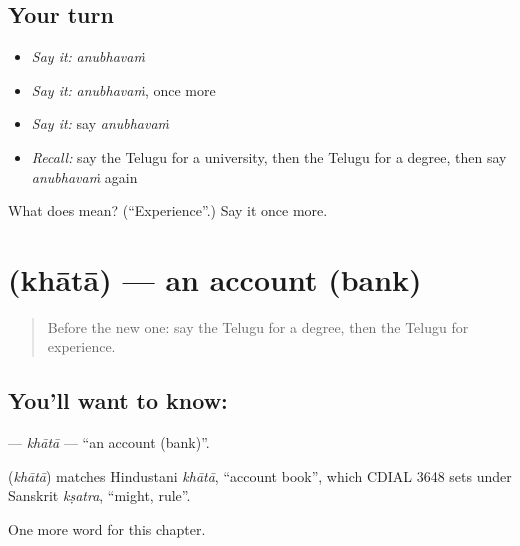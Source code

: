 \subsection*{Your turn}
\begin{itemize}
\raggedright
  \item \emph{Say it:} \emph{anubhavaṁ}
  \item \emph{Say it:} \emph{anubhavaṁ}, once more
  \item \emph{Say it:} say \emph{anubhavaṁ}
  \item \emph{Recall:} say the Telugu for a university, then the Telugu for a degree, then say \emph{anubhavaṁ} again
\end{itemize}

\begin{tcolorbox}[breakable,colback=teal!4,colframe=teal!35!black,title={Before you move on}]
What does  mean? (\textquotedblleft{}Experience\textquotedblright{}.) Say it once more.
\end{tcolorbox}
\section[\texorpdfstring{\te{ఖాతా} (khātā)}{ఖాతా (khātā)}]{ (khātā) — an account (bank)}

\label{lesson:TE-C311-khata}



\begin{quote}
Before the new one: say the Telugu for a degree, then the Telugu for experience.
\end{quote}

\subsection*{You'll want to know: }
\textbf{} — \emph{khātā} — \textquotedblleft{}an account (bank)\textquotedblright{}.

\begin{cousinweb}
\textbf{} (\emph{khātā}) matches Hindustani \emph{khātā}, \textquotedblleft{}account book\textquotedblright{}, which CDIAL 3648 sets under Sanskrit \emph{kṣatra}, \textquotedblleft{}might, rule\textquotedblright{}.
\end{cousinweb}

\begin{grammarlens}[title={What you've built}]
One more word for this chapter.
\end{grammarlens}

